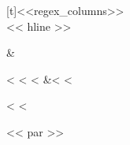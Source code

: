 \documentclass[letterpaper,10pt,english]{sphinxmanual}
\begin{document}
\begin{fulllineitems}
\begin{savenotes}
\begin{tabulary}{\linewidth}[t]{<<regex_columns>>}
\\
<< hline >>\begin{varwidth}[t]{}
\sphinxstyletheadfamily {}
\sphinxbeforeendvarwidth
\end{varwidth}%
&\begin{varwidth}[t]{}<%
\sphinxhline\sphinxstyletheadfamily<%
\hline\sphinxstyletheadfamily<%
&<%
<%
\end{varwidth}%
<%
<%
\end{tabulary}
<< par >>
\sphinxattableend\end{savenotes}

\end{fulllineitems}


\vspace{5px}
\end{document}
